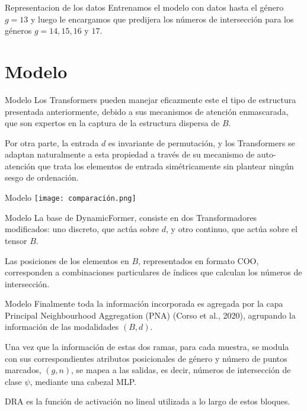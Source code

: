 \documentclass{beamer}
\begin{document}
\begin{frame}{Representacion de los datos}
    Entrenamos el modelo con datos hasta el género $g = 13$ y luego le encargamos que predijera los números de intersección para los géneros $g = 14, 15, 16 \text{ y } 17$.
\end{frame}

\section{Modelo}
\begin{frame}{Modelo}
    Los Transformers pueden manejar eficazmente este el tipo de estructura presentada anteriormente, debido a sus mecanismos de atención enmascarada, que son expertos en la captura de la estructura dispersa de $B$.
    \newline
    \pause
        
    Por otra parte, la entrada $d$ es invariante de permutación, y los Transformers se adaptan naturalmente a esta propiedad a través de su mecanismo de auto-atención que trata los elementos de entrada simétricamente sin plantear ningún sesgo de ordenación.
\end{frame}

\begin{frame}{Modelo}
    \texttt{[image: comparación.png]}
\end{frame}

\begin{frame}{Modelo}
    La base de DynamicFormer, consiste en dos Transformadores modificados: uno discreto, que actúa sobre $d$, y otro continuo, que actúa sobre el tensor $B$.
    \newline
    \pause
        
    Las posiciones de los elementos en $B$, representados en formato COO, corresponden a combinaciones particulares de índices que calculan los números de intersección. 
\end{frame}

\begin{frame}{Modelo}
    Finalmente toda la información incorporada es agregada por la capa Principal Neighbourhood Aggregation (PNA) (Corso et al., 2020), agrupando la información de las modalidades $(B,d)$.
    \newline
    \pause
    
    Una vez que la información de estas dos ramas, para cada muestra, se modula con sus correspondientes atributos posicionales de género y número de puntos marcados, $(g, n)$, se mapea a las salidas, es decir, números de intersección de clase $\psi$, mediante una cabezal MLP. 
    \newline
    \pause
    
    DRA es la función de activación no lineal utilizada a lo largo de estos bloques.
\end{frame}
\end{document}

